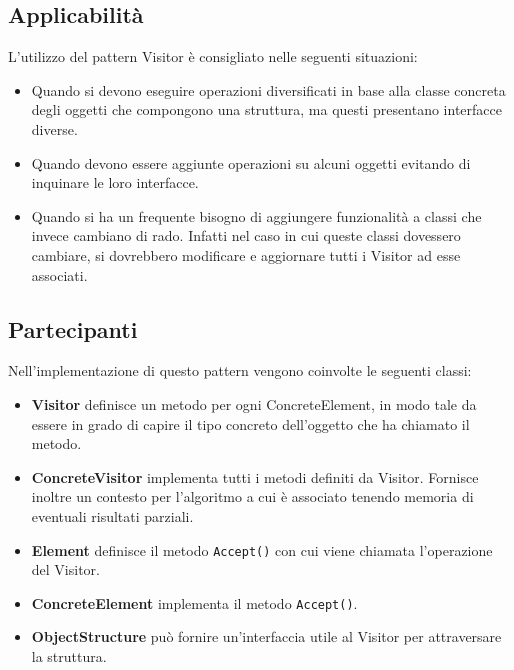 \subsection{Applicabilità}
L'utilizzo del pattern Visitor è consigliato nelle seguenti situazioni:
\begin{itemize}
\item Quando si devono eseguire operazioni diversificati in base alla classe concreta degli oggetti che compongono una struttura, ma questi presentano interfacce diverse.
\item Quando devono essere aggiunte operazioni su alcuni oggetti evitando di inquinare le loro interfacce.
\item Quando si ha un frequente bisogno di aggiungere funzionalità a classi che invece cambiano di rado. Infatti nel caso in cui queste classi dovessero cambiare, si dovrebbero modificare e aggiornare tutti i Visitor ad esse associati.
\end{itemize}

\subsection{Partecipanti}
Nell'implementazione di questo pattern vengono coinvolte le seguenti classi:
\begin{itemize}
\item \textbf{Visitor} definisce un metodo per ogni ConcreteElement, in modo tale da essere in grado di capire il tipo concreto dell'oggetto che ha chiamato il metodo.
\item \textbf{ConcreteVisitor} implementa tutti i metodi definiti da Visitor. Fornisce inoltre un contesto per l'algoritmo a cui è associato tenendo memoria di eventuali risultati parziali.
\item \textbf{Element} definisce il metodo \texttt{Accept()} con cui viene chiamata l'operazione del Visitor.
\item \textbf{ConcreteElement} implementa il metodo \texttt{Accept()}.
\item \textbf{ObjectStructure} può fornire un'interfaccia utile al Visitor per attraversare la struttura.
\end{itemize}

